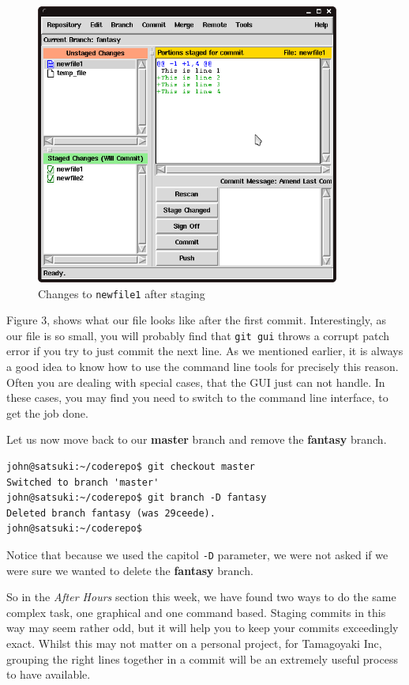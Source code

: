\begin{figure}[hbt]
\centering
\includegraphics[width=10cm]{images/f-af5-d3.png}
\caption{Changes to \texttt{newfile1} after staging}
\end{figure} 

Figure 3, shows what our file looks like after the first commit.  Interestingly, as our file is so small, you will probably find that \texttt{git gui} throws a corrupt patch error if you try to just commit the next line.  As we mentioned earlier, it is always a good idea to know how to use the command line tools for precisely this reason.  Often you are dealing with special cases, that the GUI just can not handle.  In these cases, you may find you need to switch to the command line interface, to get the job done.

Let us now move back to our \textbf{master} branch and remove the \textbf{fantasy} branch.

\begin{Verbatim}[frame=leftline,framerule=1mm,fontsize=\relsize{-3}] 
john@satsuki:~/coderepo$ git checkout master
Switched to branch 'master'
john@satsuki:~/coderepo$ git branch -D fantasy
Deleted branch fantasy (was 29ceede).
john@satsuki:~/coderepo$ 
\end{Verbatim}

Notice that because we used the capitol \texttt{-D} parameter, we were not asked if we were sure we wanted to delete the \textbf{fantasy} branch.

So in the \emph{After Hours} section this week, we have found two ways to do the same complex task, one graphical and one command based.  Staging commits in this way may seem rather odd, but it will help you to keep your commits exceedingly exact.  Whilst this may not matter on a personal project, for Tamagoyaki Inc, grouping the right lines together in a commit will be an extremely useful process to have available.
